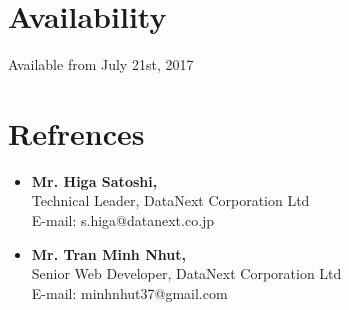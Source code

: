 \documentclass[margin,line]{res}
\begin{document}
\begin{resume}
\section{Availability}
Available from July 21st, 2017
\section{Refrences}
\begin{itemize} \itemsep -2pt  %
  \item {\bf Mr. Higa Satoshi,}\\
  Technical Leader, DataNext Corporation Ltd \\
  E-mail: s.higa@datanext.co.jp \\



  \item {\bf Mr. Tran Minh Nhut,}\\
  Senior Web Developer, DataNext Corporation Ltd \\
  E-mail: minhnhut37@gmail.com \\

\end{itemize}

\end{resume} 
\end{document}
